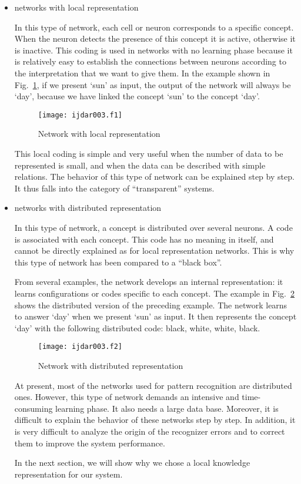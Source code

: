 \documentclass[ijdar]{svjour}
\begin{document}
\begin{itemize}

\item networks with local representation

In this type of network, each cell or neuron corresponds to a specific
concept. When the neuron detects the presence of this concept it is
active, otherwise it is inactive. This coding is used in networks with
no learning phase because it is relatively easy to establish the
connections between neurons according to the interpretation that we want
to give them. In the example shown in Fig.~\ref{FIGLOCAL}, if we
present `sun' as input, the output of the network will always be `day',
because we have linked the concept `sun' to the concept `day'.

\begin{figure}%
\texttt{[image: ijdar003.f1]}%
\caption{Network with local representation}
\label{FIGLOCAL}
\end{figure}

This local coding is simple and very useful when the number of data to
be represented is small, and when the data can be described with simple
relations. The behavior of this type of network can be explained step by
step. It thus falls into the category of ``transparent''
systems.\eject

\item networks with distributed representation

In this type of network, a concept is distributed over several neurons.
A code is associated with each concept. This code has no meaning in
itself, and cannot be directly explained as for local representation
networks. This is why this type of network has been compared to a
``black box''.

From several examples, the network develops an internal representation:
it learns configurations or\break
codes specific to each concept. The example
in Fig.~\ref{FIGDIST} shows the distributed version of the preceding
example. The network learns to answer `day' when we present `sun' as
input. It then represents the concept `day' with the following
distributed code: black, white, white, black.

\begin{figure}%
\texttt{[image: ijdar003.f2]}%
\caption{Network with distributed representation}
\label{FIGDIST}
\end{figure}

At present, most of the networks used for pattern recognition are
distributed ones. However, this type of network demands an intensive and
time-consuming learning phase. It also needs a large data base.
Moreover, it is difficult to explain the behavior of these networks step
by step. In addition, it is very difficult to analyze the origin of the
recognizer errors and to correct them to improve the system performance.

In the next section, we will show why we chose a local knowledge
representation for our system.

\end{itemize}
\end{document}
